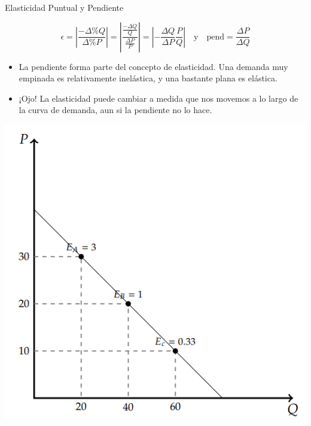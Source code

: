 \documentclass{beamer}
\begin{document}
\begin{frame}{Elasticidad Puntual y Pendiente}
  \begin{footnotesize}
    \begin{equation*}
      \epsilon = \left|\frac{- \Delta \% Q}{\Delta \% P}\right| = \left|\frac{\frac{- \Delta Q}{Q}}{\frac{\Delta P}{P}}\right| = \left|-\frac{\Delta Q}{\Delta P} \frac{P}{Q}\right|\,\,\,\,\,\,\text{y}\,\,\,\,\,\, \text{pend} = \frac{\Delta P}{\Delta Q}
    \end{equation*}
    
  \end{footnotesize}
  \begin{itemize}
    \item La pendiente forma parte del concepto de elasticidad. Una demanda muy empinada es relativamente inelástica, y una bastante plana es elástica.
    \item ¡Ojo! La elasticidad puede cambiar a medida que nos movemos a lo largo de la curva de demanda, aun si la pendiente no lo hace.
  \end{itemize}
    \centering
    \includegraphics[scale=0.35]{../Figures/C16.7.png}
\end{frame}
\end{document}
